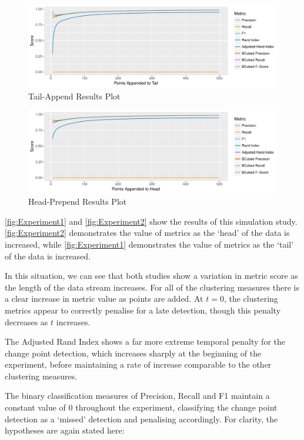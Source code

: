 \documentclass[../main.tex]{subfiles}
\begin{document}
\begin{figure}[h]
    \includegraphics[width=\textwidth]{figures/Experiment1}
    \caption{Tail-Append Results Plot}
    \label{fig:Experiment1}
\end{figure}

\begin{figure}[h]
    \includegraphics[width=\textwidth]{figures/Experiment4}
    \caption{Head-Prepend Results Plot}
    \label{fig:Experiment2}
\end{figure}

\autoref{fig:Experiment1} and \autoref{fig:Experiment2} show the results of this simulation study. \autoref{fig:Experiment2} demonstrates the value of metrics as the `head' of the data is increased, while \autoref{fig:Experiment1} demonstrates the value of metrics as the `tail' of the data is increased.

In this situation, we can see that both studies show a variation in metric score as the length of the data stream increases. For all of the clustering measures there is a clear increase in metric value as points are added. At $t=0$, the clustering metrics appear to correctly penalise for a late detection, though this penalty decreases as $t$ increases.

The Adjusted Rand Index shows a far more extreme temporal penalty for the change point detection, which increases sharply at the beginning of the experiment, before maintaining a rate of increase comparable to the other clustering measures.

The binary classification measures of Precision, Recall and F1 maintain a constant value of $0$ throughout the experiment, classifying the change point detection as a `missed' detection and penalising accordingly. For clarity, the hypotheses are again stated here:
\end{document}
